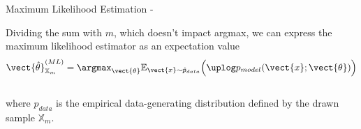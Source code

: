 \begin{frame}[t,allowframebreaks]{
    Maximum Likelihood Estimation -}
    \vspace{0.2cm}

    Dividing the sum with $m$, which doesn't impact argmax, 
    we can express the 
    \gls{maximum likelihood estimator}
    as an expectation value
    \begin{equation}
        \vect{\hat{\theta}}_{\mathbb{X}_{m}}^{(ML)} = 
        \argmax_{\vect{\theta}} \mathbb{E}_{\vect{x} \sim \hat{p}_{data}}
        \Big(
            \uplog p_{model}(\vect{x};\vect{\theta})
        \Big)
        \label{eq:mle_estimator_4}
    \end{equation}\\
    where $\hat{p}_{data}$ is the empirical data-generating distribution
    defined by the drawn sample $\mathbb{X}_{m}$.

    \framebreak


\end{frame}
